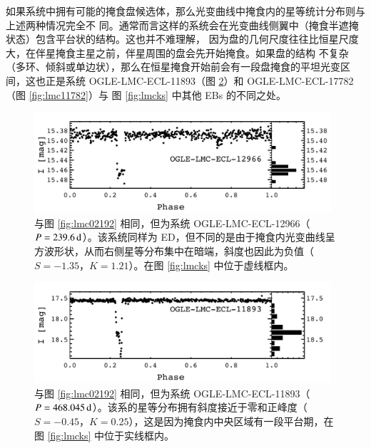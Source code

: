 如果系统中拥有可能的掩食盘候选体，那么光变曲线中掩食内的星等统计分布则与上述两种情况完全不
同。通常而言这样的系统会在光变曲线侧翼中（掩食半遮掩状态）包含平台状的结构。这也并不难理解，
因为盘的几何尺度往往比恒星尺度大，在伴星掩食主星之前，伴星周围的盘会先开始掩食。如果盘的结构
不复杂（多环、倾斜或单边状），那么在恒星掩食开始前会有一段盘掩食的平坦光变区间，这也正是系统 
OGLE-LMC-ECL-11893（图 \ref{fig:lmc11893}）和 OGLE-LMC-ECL-17782（图 \ref{fig:lmc11782}）与
图 \ref{fig:lmcks} 中其他 EBs 的不同之处。

\begin{figure}[t]
\centering
\includegraphics[width=0.98\textwidth,trim={0.0in 0.2in 0 0}]{figures/chapter3/f7_lmc12966.pdf}
\caption{与图 \ref{fig:lmc02192} 相同，但为系统 OGLE-LMC-ECL-12966（$P = 239.6\, \mathrm{d}$）。该系统同样为 ED，但不同的是由于掩食内光变曲线呈方波形状，从而右侧星等分布集中在暗端，斜度也因此为负值（$S=-1.35$，$K=1.21$）。在图 \ref{fig:lmcks} 中位于虚线框内。}
\label{fig:lmc12966}
\end{figure}


\begin{figure}[ht!]
\centering
\includegraphics[width=0.98\textwidth,trim={0.0in 0.2in 0 0}]{figures/chapter3/f8_lmc11893.pdf}
\caption{与图 \ref{fig:lmc02192} 相同，但为系统 OGLE-LMC-ECL-11893（$P = 468.045\, \mathrm{d}$）。该系的星等分布拥有斜度接近于零和正峰度（$S=-0.45$，$K=0.25$），这是因为掩食内中央区域有一段平台期，在图 \ref{fig:lmcks} 中位于实线框内。}
\label{fig:lmc11893}
\end{figure}


